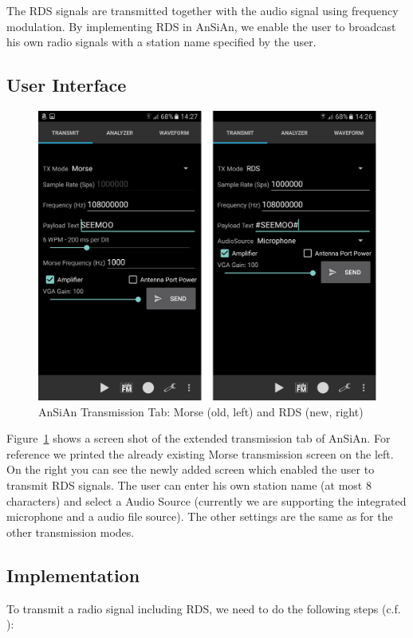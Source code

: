 The RDS signals are transmitted together with the audio signal using frequency modulation. By implementing RDS in AnSiAn, we enable the user to broadcast his own radio signals with a station name specified by the user. 

\subsection{User Interface}
\begin{figure}
	\centering
	\includegraphics[width=1.0\linewidth]{gfx/screenshot_rds.png}
	\caption{AnSiAn Transmission Tab: Morse (old, left) and RDS (new, right)}
	\label{fig:impl:screenshotrds}
\end{figure}


Figure~\ref{fig:impl:screenshotrds} shows a screen shot of the extended transmission tab of AnSiAn. For reference we printed the already existing Morse transmission screen on the left. On the right you can see the newly added screen which enabled the user to transmit RDS signals. The user can enter his own station name (at most 8 characters) and select a Audio Source (currently we are supporting the integrated microphone and a audio file source). The other settings are the same as for the other transmission modes. 


\subsection{Implementation}
To transmit a radio signal including RDS, we need to do the following steps (c.f. \cite{RDS1999}):


